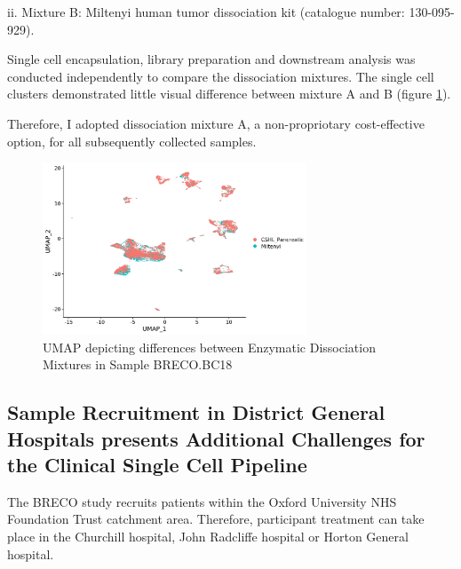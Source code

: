 ii. Mixture B: Miltenyi human tumor dissociation kit (catalogue number: 130-095-929).

Single cell encapsulation, library preparation and downstream analysis was conducted independently to compare the dissociation mixtures. The single cell clusters demonstrated little visual difference between mixture A and B (figure \ref{fig:bro18_dissociation_miltenyi_vs_cshl}). 

Therefore, I adopted dissociation mixture A, a non-propriotary cost-effective option, for all subsequently collected samples.


\begin{figure}
	\centering
	\includegraphics[width=0.7\textwidth]{figures/bro18_dissociation_miltenyi_vs_cshl.png} 
	\caption[Comparison of Dissociation Mixtures.]{UMAP depicting differences between Enzymatic Dissociation Mixtures in Sample BRECO.BC18}
	\label{fig:bro18_dissociation_miltenyi_vs_cshl}
\end{figure}



\subsection{Sample Recruitment in District General Hospitals presents Additional Challenges for the Clinical Single Cell Pipeline}

The BRECO study recruits patients within the Oxford University NHS Foundation Trust catchment area. Therefore, participant treatment can take place in the Churchill hospital, John Radcliffe hospital or Horton General hospital.


